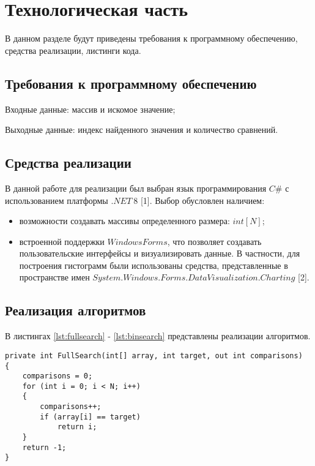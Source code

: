 \chapter{Технологическая часть}

В данном разделе будут приведены требования к программному обеспечению, средства реализации, листинги кода.

\section{Требования к программному обеспечению}

Входные данные: массив и искомое значение;

Выходные данные: индекс найденного значения и количество сравнений.

\section{Средства реализации}
В данной работе для реализации был выбран язык программирования $C\#$ с использованием платформы $.NET\ 8$ [1]. Выбор обусловлен наличием:
\begin{itemize}
    \item возможности создавать массивы определенного размера: $int[N]$;
    \item встроенной поддержки $Windows Forms$, что позволяет создавать пользовательские интерфейсы и визуализировать данные. В частности, для построения гистограмм были использованы средства, представленные в пространстве имен $System.Windows.Forms.DataVisualization.Charting$ [2].
\end{itemize}

\section{Реализация алгоритмов}

В листингах \ref{lst:fullsearch} - \ref{lst:binsearch} представлены реализации алгоритмов.

\clearpage

\begin{center}
\captionsetup{justification=raggedright,singlelinecheck=off}
\begin{lstlisting}[label=lst:fullsearch,caption=Алгоритм использующий полный перебор]
private int FullSearch(int[] array, int target, out int comparisons)
{
    comparisons = 0;
    for (int i = 0; i < N; i++)
    {
        comparisons++;
        if (array[i] == target)
            return i;
    }
    return -1;
}
\end{lstlisting}
\end{center}


